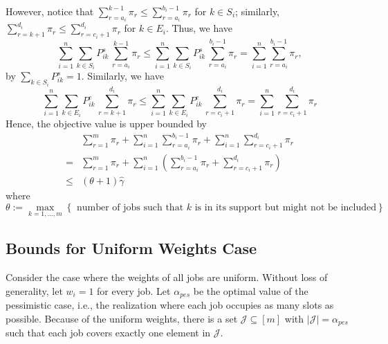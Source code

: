 \documentclass{article}
\begin{document}
However, notice that $\sum_{r=a_i}^{k-1}\pi_r\leq \sum_{r=a_i}^{b_i-1}\pi_r$ for $k\in S_i$; similarly, $\sum_{r=k+1}^{d_i}\pi_r\leq \sum_{r=c_i+1}^{d_i}\pi_r$ for $k\in E_i$.
Thus, we have 
\[\sum_{i=1}^{n}\sum_{k\in S_i} P^s_{ik}\, \sum_{r=a_i}^{k-1}\pi_r \leq  \sum_{i=1}^{n}\sum_{k\in S_i} P^s_{ik}\, \sum_{r=a_i}^{b_i-1}\pi_r = \sum_{i=1}^{n}\sum_{r=a_i}^{b_i-1}\pi_r,\]
by $\sum_{k\in S_i}P_{ik}^{s}=1.$ Similarly, we have 
\[\sum_{i=1}^{n}\sum_{k\in E_i} P^e_{ik}\, \sum_{r=k+1}^{d_i}\pi_r \leq  \sum_{i=1}^{n}\sum_{k\in E_i} P^e_{ik}\, \sum_{r=c_i+1}^{d_i}\pi_r = \sum_{i=1}^{n}\sum_{r=c_i+1}^{d_i}\pi_r\]
Hence, the objective value is upper bounded by
\begin{align*}
&\sum_{r=1}^{m}\pi_r+\sum_{i=1}^{n}\sum_{r=a_i}^{b_i-1}\pi_r+\sum_{i=1}^{n}\sum_{r=c_i+1}^{d_i}\pi_r\\
=&\sum_{r=1}^{m}\pi_r+\sum_{i=1}^{n}\left(\sum_{r=a_i}^{b_i-1}\pi_r+\sum_{r=c_i+1}^{d_i}\pi_r\right)\\
\leq &(\theta+1)\hat{\gamma}
\end{align*}
where 
\[\theta:=\max_{k=1,\ldots,m}\left\{\text{ number of jobs such that $k$ is in its support but might not be included}\right\}\]
\subsection{Bounds for Uniform Weights Case }
Consider the case where the weights of all jobs are uniform. 
Without loss of generality, let $w_i=1$ for every job.
Let $\alpha_{pes}$ be the optimal value of the pessimistic case, i.e., the realization where each job occupies as many slots as possible.
Because of the uniform weights, there is a set $\mathcal{J}\subseteq [m]$ with $|\mathcal{J}|=\alpha_{pes}$ such that each job covers exactly one element in $\mathcal{J}$.
\end{document}
